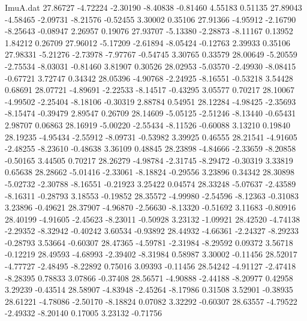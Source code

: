 \begin{filecontents}{ImuA.dat}
  27.86727   -4.72224   -2.30190   -8.40838   -0.81460    4.55183    0.51135
  27.89043   -4.58465   -2.09731   -8.21576   -0.52455    3.30002    0.35106
  27.91366   -4.95912   -2.16790   -8.25643   -0.08947    2.26957    0.19076
  27.93707   -5.13380   -2.28873   -8.11167    0.13952    1.84212    0.26709
  27.96012   -5.17209   -2.61894   -8.05424   -0.12763    2.39933    0.35106
  27.98331   -5.21276   -2.73978   -7.97767   -0.54745    3.30765    0.33579
  28.00649   -5.20559   -2.75534   -8.03031   -0.81460    3.81907    0.30526
  28.02953   -5.03570   -2.49930   -8.08415   -0.67721    3.72747    0.34342
  28.05396   -4.90768   -2.24925   -8.16551   -0.53218    3.54428    0.68691
  28.07721   -4.89691   -2.22533   -8.14517   -0.43295    3.05577    0.70217
  28.10067   -4.99502   -2.25404   -8.18106   -0.30319    2.88784    0.54951
  28.12284   -4.98425   -2.35693   -8.15474   -0.39479    2.89547    0.26709
  28.14609   -5.05125   -2.51246   -8.13440   -0.65431    2.98707    0.06863
  28.16919   -5.00220   -2.55434   -8.11526   -0.60088    3.13210    0.19840
  28.19235   -4.95434   -2.55912   -8.09731   -0.53982    3.39925    0.46555
  28.21541   -4.91605   -2.48255   -8.23610   -0.48638    3.36109    0.48845
  28.23898   -4.84666   -2.33659   -8.20858   -0.50165    3.44505    0.70217
  28.26279   -4.98784   -2.31745   -8.29472   -0.30319    3.33819    0.65638
  28.28662   -5.01416   -2.33061   -8.18824   -0.29556    3.23896    0.34342
  28.30898   -5.02732   -2.30788   -8.16551   -0.21923    3.25422    0.04574
  28.33248   -5.07637   -2.43589   -8.16311   -0.28793    3.18553   -0.19852
  28.35572   -4.99980   -2.54596   -8.12363   -0.31083    3.23896   -0.49621
  28.37907   -4.96870   -2.56630   -8.13320   -0.51692    3.11683   -0.80916
  28.40199   -4.91605   -2.45623   -8.23011   -0.50928    3.23132   -1.09921
  28.42520   -4.74138   -2.29352   -8.32942   -0.40242    3.60534   -0.93892
  28.44932   -4.66361   -2.24327   -8.29233   -0.28793    3.53664   -0.60307
  28.47365   -4.59781   -2.31984   -8.29592    0.09372    3.56718   -0.12219
  28.49593   -4.68993   -2.39402   -8.31984    0.58987    3.30002   -0.11456
  28.52017   -4.77727   -2.48495   -8.22892    0.75016    3.09393   -0.11456
  28.54242   -4.91127   -2.47418   -8.28395    0.78833    3.07866   -0.37408
  28.56571   -4.90888   -2.44188   -8.20977    0.42958    3.29239   -0.43514
  28.58907   -4.83948   -2.45264   -8.17986    0.31508    3.52901   -0.38935
  28.61221   -4.78086   -2.50170   -8.18824    0.07082    3.32292   -0.60307
  28.63557   -4.79522   -2.49332   -8.20140    0.17005    3.23132   -0.71756

\end{filecontents}
